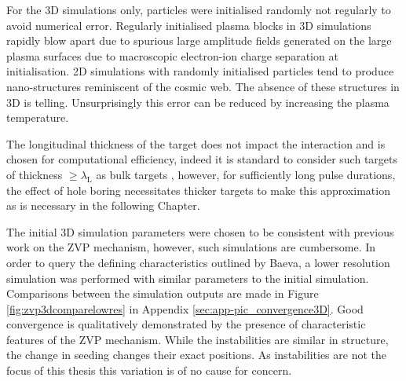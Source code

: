 For the 3D simulations only, particles were initialised randomly not regularly to avoid numerical error. Regularly initialised plasma blocks in 3D simulations rapidly blow apart due to spurious large amplitude fields generated on the large plasma surfaces due to macroscopic electron-ion charge separation at initialisation. 2D simulations with randomly initialised particles tend to produce nano-structures reminiscent of the cosmic web. The absence of these structures in 3D is telling. Unsurprisingly this error can be reduced by increasing the plasma temperature.

The longitudinal thickness of the target does not impact the interaction and is chosen for computational efficiency, indeed it is standard to consider such targets of thickness $\ge \lambda_\mathrm{L}$ as bulk targets \cite{dollarEnhancedLaserAbsorption2017}, however, for sufficiently long pulse durations, the effect of hole boring necessitates thicker targets to make this approximation as is necessary in the following Chapter.

The initial 3D simulation parameters were chosen to be consistent with previous work on the \ac{ZVP} mechanism, however, such simulations are cumbersome. In order to query the defining characteristics outlined by Baeva, a lower resolution simulation was performed with similar parameters to the initial simulation. Comparisons between the simulation outputs are made in Figure \ref{fig:zvp3dcomparelowres} in Appendix \ref{sec:app-pic_convergence3D}. Good convergence is qualitatively demonstrated by the presence of characteristic features of the ZVP mechanism. While the instabilities are similar in structure, the change in seeding changes their exact positions. As instabilities are not the focus of this thesis this variation is of no cause for concern.

